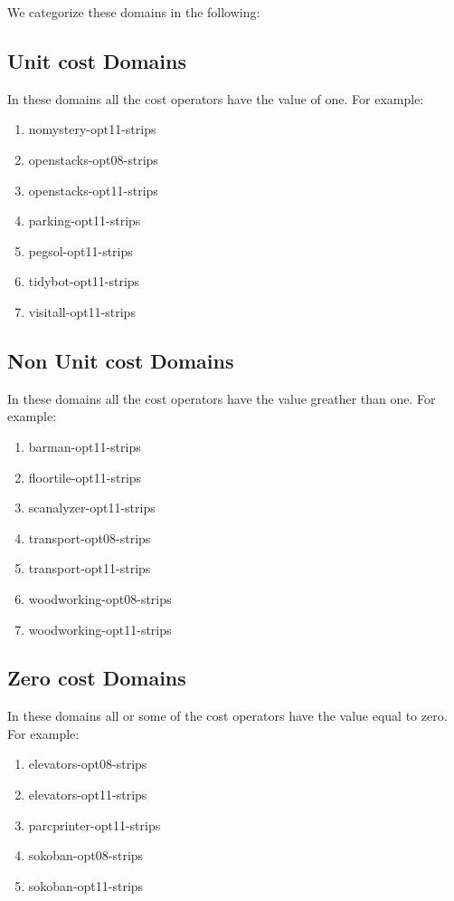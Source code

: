 \documentclass[11pt,a4paper,oneside]{report}
\begin{document}
We categorize these domains in the following:
\subsection{Unit cost Domains}
In these domains all the cost operators have the value of one. For example:
\begin{enumerate}
	\item nomystery-opt11-strips
	\item openstacks-opt08-strips
	\item openstacks-opt11-strips
	\item parking-opt11-strips
	\item pegsol-opt11-strips
	\item tidybot-opt11-strips
	\item visitall-opt11-strips
\end{enumerate}

\subsection{Non Unit cost Domains}
In these domains all the cost operators have the value greather than one. For example:
\begin{enumerate}
	\item barman-opt11-strips
	\item floortile-opt11-strips
	\item scanalyzer-opt11-strips
	\item transport-opt08-strips
	\item transport-opt11-strips
	\item woodworking-opt08-strips
	\item woodworking-opt11-strips
\end{enumerate}

\subsection{Zero cost Domains}
In these domains all or some of the cost operators have the value equal to zero. For example:
\begin{enumerate}
	\item elevators-opt08-strips
	\item elevators-opt11-strips
	\item parcprinter-opt11-strips
	\item sokoban-opt08-strips
	\item sokoban-opt11-strips
\end{enumerate}
\end{document}
